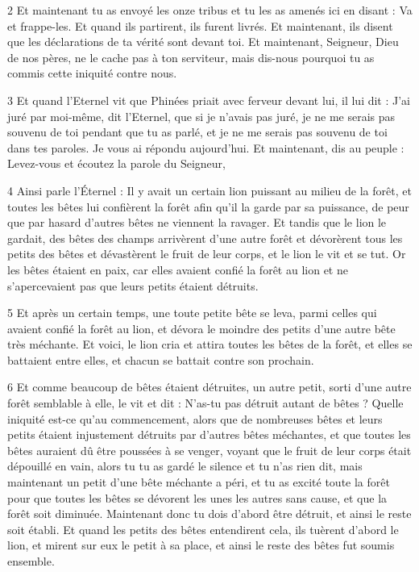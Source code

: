 \par 2 Et maintenant tu as envoyé les onze tribus et tu les as amenés ici en disant : Va et frappe-les. Et quand ils partirent, ils furent livrés. Et maintenant, ils disent que les déclarations de ta vérité sont devant toi. Et maintenant, Seigneur, Dieu de nos pères, ne le cache pas à ton serviteur, mais dis-nous pourquoi tu as commis cette iniquité contre nous.

\par 3 Et quand l'Eternel vit que Phinées priait avec ferveur devant lui, il lui dit : J'ai juré par moi-même, dit l'Eternel, que si je n'avais pas juré, je ne me serais pas souvenu de toi pendant que tu as parlé, et je ne me serais pas souvenu de toi dans tes paroles. Je vous ai répondu aujourd'hui. Et maintenant, dis au peuple : Levez-vous et écoutez la parole du Seigneur,

\par 4 Ainsi parle l'Éternel : Il y avait un certain lion puissant au milieu de la forêt, et toutes les bêtes lui confièrent la forêt afin qu'il la garde par sa puissance, de peur que par hasard d'autres bêtes ne viennent la ravager. Et tandis que le lion le gardait, des bêtes des champs arrivèrent d'une autre forêt et dévorèrent tous les petits des bêtes et dévastèrent le fruit de leur corps, et le lion le vit et se tut. Or les bêtes étaient en paix, car elles avaient confié la forêt au lion et ne s'apercevaient pas que leurs petits étaient détruits.

\par 5 Et après un certain temps, une toute petite bête se leva, parmi celles qui avaient confié la forêt au lion, et dévora le moindre des petits d'une autre bête très méchante. Et voici, le lion cria et attira toutes les bêtes de la forêt, et elles se battaient entre elles, et chacun se battait contre son prochain.

\par 6 Et comme beaucoup de bêtes étaient détruites, un autre petit, sorti d'une autre forêt semblable à elle, le vit et dit : N'as-tu pas détruit autant de bêtes ? Quelle iniquité est-ce qu'au commencement, alors que de nombreuses bêtes et leurs petits étaient injustement détruits par d'autres bêtes méchantes, et que toutes les bêtes auraient dû être poussées à se venger, voyant que le fruit de leur corps était dépouillé en vain, alors tu tu as gardé le silence et tu n'as rien dit, mais maintenant un petit d'une bête méchante a péri, et tu as excité toute la forêt pour que toutes les bêtes se dévorent les unes les autres sans cause, et que la forêt soit diminuée. Maintenant donc tu dois d'abord être détruit, et ainsi le reste soit établi. Et quand les petits des bêtes entendirent cela, ils tuèrent d'abord le lion, et mirent sur eux le petit à sa place, et ainsi le reste des bêtes fut soumis ensemble.

